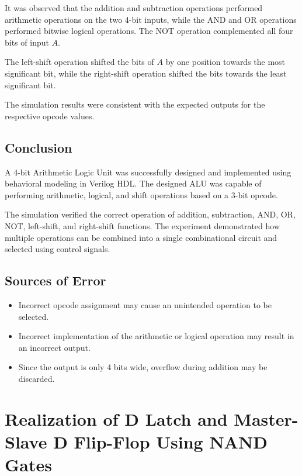 \documentclass[12pt,a4paper]{report}
\begin{document}
It was observed that the addition and subtraction operations performed arithmetic operations on the two 4-bit inputs, while the AND and OR operations performed bitwise logical operations. The NOT operation complemented all four bits of input $A$.

The left-shift operation shifted the bits of $A$ by one position towards the most significant bit, while the right-shift operation shifted the bits towards the least significant bit.

The simulation results were consistent with the expected outputs for the respective opcode values.


\section{Conclusion}

A 4-bit Arithmetic Logic Unit was successfully designed and implemented using behavioral modeling in Verilog HDL. The designed ALU was capable of performing arithmetic, logical, and shift operations based on a 3-bit opcode.

The simulation verified the correct operation of addition, subtraction, AND, OR, NOT, left-shift, and right-shift functions. The experiment demonstrated how multiple operations can be combined into a single combinational circuit and selected using control signals.

\section{Sources of Error}

\begin{itemize}
    \item Incorrect opcode assignment may cause an unintended operation to be selected.
    \item Incorrect implementation of the arithmetic or logical operation may result in an incorrect output.
    \item Since the output is only 4 bits wide, overflow during addition may be discarded.

\end{itemize}


\chapter{Realization of D Latch and Master-Slave D Flip-Flop Using NAND Gates}
\label{ch:exp7}
\end{document}
